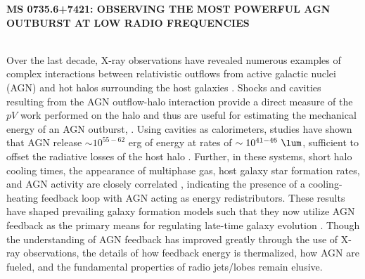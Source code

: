 \documentclass[11pt]{article}
\begin{document}
\pagestyle{plain}

\begin{center}
  {\bf\uppercase{MS 0735.6+7421: Observing The Most Powerful AGN
      Outburst at Low Radio Frequencies}}
\end{center}

\\

Over the last decade, X-ray observations have revealed numerous
examples of complex interactions between relativistic outflows from
active galactic nuclei (AGN) and hot halos surrounding the host
galaxies \cite{hydraa0, perseus1}. Shocks and cavities resulting from
the AGN outflow-halo interaction provide a direct measure of the $pV$
work performed on the halo and thus are useful for estimating the
mechanical energy of an AGN outburst, \cite[see][for a
  review]{mcnamrev}. Using cavities as calorimeters, studies have
shown that AGN release $\sim 10^{55-62}$ erg of energy at rates of
$\sim 10^{41-46} ~\lum$, sufficient to offset the radiative losses of
the host halo \cite[\eg][]{birzan04, dunn06}. Further, in these
systems, short halo cooling times, the appearance of multiphase gas,
host galaxy star formation rates, and AGN activity are closely
correlated \cite{crawford99, edge01, haradent, rafferty06}, indicating
the presence of a cooling-heating feedback loop with AGN acting as
energy redistributors. These results have shaped prevailing galaxy
formation models such that they now utilize AGN feedback as the
primary means for regulating late-time galaxy evolution
\cite[\eg][]{croton06, bower06, sijacki07}. Though the understanding
of AGN feedback has improved greatly through the use of X-ray
observations, the details of how feedback energy is thermalized, how
AGN are fueled, and the fundamental properties of radio jets/lobes
remain elusive.
\end{document}
